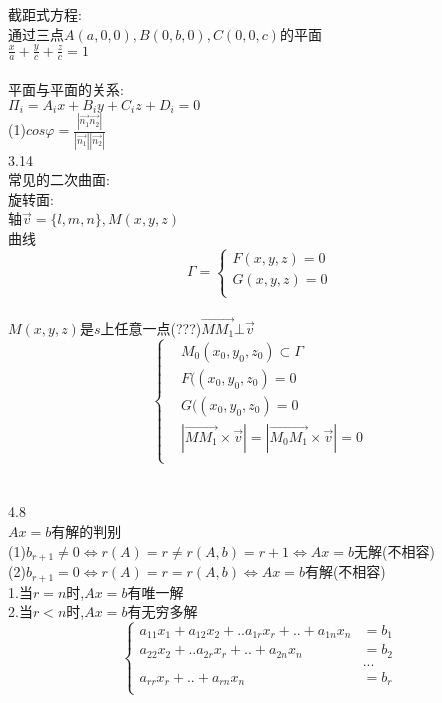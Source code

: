 \documentclass[11pt, a4paper, UTF8]{ctexart}
\begin{document}
截距式方程:\\
通过三点$ A(a,0,0),B(0,b,0),C(0,0,c) $的平面\\
$ \frac{x}{a}+\frac{y}{c}+\frac{z}{c}=1 $\\
\\
平面与平面的关系:\\
$ \Pi_i=A_ix+B_iy+C_iz+D_i=0 $\\
(1)$ cos\varphi=\frac{|\overrightarrow{n_1}\overrightarrow{n_2}|}{|\overrightarrow{n_1}||\overrightarrow{n_2}|} $\\
3.14\\
常见的二次曲面:\\
旋转面:\\
轴$ \vec{v}=\{l,m,n\},M(x,y,z) $\\
曲线
$$ \varGamma=\left\{
\begin{aligned}
F(x,y,z)=0\\
G(x,y,z)=0\\
\end{aligned}
\right.
$$\\
$ M(x,y,z) $是$ s $上任意一点(???)$ \overrightarrow{MM_1}\bot\vec{v} $\\
$$ 
\left\{
\begin{aligned}
&M_0(x_0,y_0,z_0)\subset\varGamma\\
&F((x_0,y_0,z_0)=0\\
&G((x_0,y_0,z_0)=0\\
&|\overrightarrow{MM_1}\times\vec{v}|=|\overrightarrow{M_0M_1}\times\vec{v}|=0\\
\end{aligned}
\right.
$$\\
\\
4.8\\
$ Ax=b $有解的判别\\
(1)$ b_{r+1}\not=0\Leftrightarrow r(A)=r\not= r(A,b)=r+1\Leftrightarrow Ax=b $无解(不相容)\\
(2)$ b_{r+1}=0\Leftrightarrow r(A)=r=r(A,b)\Leftrightarrow Ax=b $有解(不相容)\\
1.当$ r=n $时,$ Ax=b $有唯一解\\
2.当$ r<n $时,$ Ax=b $有无穷多解\\
$$ 
\left\{
\begin{aligned}
a_{11}x_1+a_{12}x_2+..a_{1r}x_r+..+a_{1n}x_n&=b_1\\
a_{22}x_2+..a_{2r}x_r+..+a_{2n}x_n&=b_2\\
&...\\
a_{rr}x_r+..+a_{rn}x_n&=b_r\\
\end{aligned}
\right.
$$\\
\end{document}
